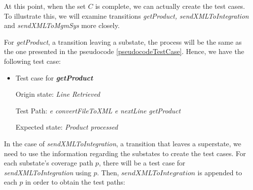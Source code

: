 At this point, when the set $C$ is complete, we can actually create the test cases. To illustrate this, we will examine transitions \textit{getProduct, sendXMLToIntegration} and \textit{sendXMLToMgmSys} more closely.

For \textit{getProduct}, a transition leaving a substate, the process will be the same as the one presented in the pseudocode \ref{pseudocodeTestCase}. Hence, we have the following test case:

\begin{itemize}

\item Test case for \textit{\textbf{getProduct}}

Origin state: \textit{Line Retrieved}

Test Path: \textit{e convertFileToXML e nextLine getProduct}

Expected state: \textit{Product processed}

\end{itemize}

In the case of \textit{sendXMLToIntegration}, a transition that leaves a superstate, we need to use the information regarding the substates to create the test cases. For each substate's coverage path $p$, there will be a test case for \textit{sendXMLToIntegration} using $p$. Then, $sendXMLToIntegration$ is appended to each $p$ in order to obtain the test paths:

